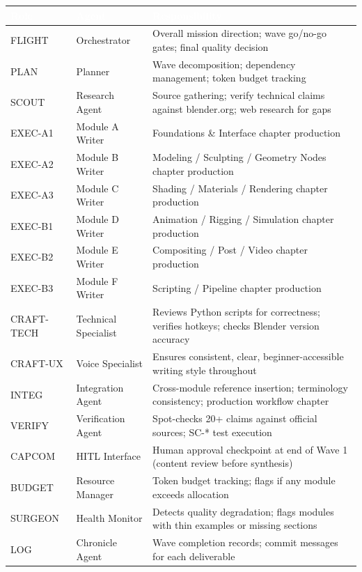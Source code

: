 \documentclass[11pt,letterpaper]{article}
\newcommand{\tableheader}[1]{\textbf{\sffamily\textcolor{white}{#1}}}
\begin{document}
\begin{center}
\begin{tabularx}{\textwidth}{L{2cm}L{3cm}X}
\toprule
{}
\tableheader{Role} & \tableheader{Agent} & \tableheader{Responsibility} \\
\midrule
FLIGHT & Orchestrator & Overall mission direction; wave go/no-go gates; final quality decision \\
PLAN & Planner & Wave decomposition; dependency management; token budget tracking \\
SCOUT & Research Agent & Source gathering; verify technical claims against blender.org; web research for gaps \\
EXEC-A1 & Module A Writer & Foundations \& Interface chapter production \\
EXEC-A2 & Module B Writer & Modeling / Sculpting / Geometry Nodes chapter production \\
EXEC-A3 & Module C Writer & Shading / Materials / Rendering chapter production \\
EXEC-B1 & Module D Writer & Animation / Rigging / Simulation chapter production \\
EXEC-B2 & Module E Writer & Compositing / Post / Video chapter production \\
EXEC-B3 & Module F Writer & Scripting / Pipeline chapter production \\
CRAFT-TECH & Technical Specialist & Reviews Python scripts for correctness; verifies hotkeys; checks Blender version accuracy \\
CRAFT-UX & Voice Specialist & Ensures consistent, clear, beginner-accessible writing style throughout \\
INTEG & Integration Agent & Cross-module reference insertion; terminology consistency; production workflow chapter \\
VERIFY & Verification Agent & Spot-checks 20+ claims against official sources; SC-* test execution \\
CAPCOM & HITL Interface & Human approval checkpoint at end of Wave 1 (content review before synthesis) \\
BUDGET & Resource Manager & Token budget tracking; flags if any module exceeds allocation \\
SURGEON & Health Monitor & Detects quality degradation; flags modules with thin examples or missing sections \\
LOG & Chronicle Agent & Wave completion records; commit messages for each deliverable \\
\bottomrule
\end{tabularx}
\end{center}
\end{document}
